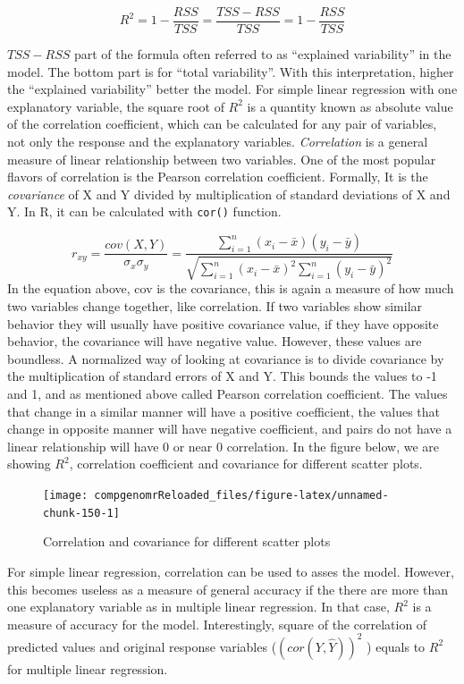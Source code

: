 \documentclass[12pt,]{krantz}
\begin{document}
\[R^2=1-\frac{RSS}{TSS}=\frac{TSS-RSS}{TSS}=1-\frac{RSS}{TSS}\]

\(TSS-RSS\) part of the formula often referred to as ``explained variability'' in
the model. The bottom part is for ``total variability''. With this interpretation, higher
the ``explained variability'' better the model. For simple linear regression
with one explanatory variable, the square root of \(R^2\) is a quantity known
as absolute value of the correlation coefficient, which can be calculated for any pair of variables, not only
the
response and the explanatory variables. \emph{Correlation} is a general measure of
linear
relationship between two variables. One
of the most popular flavors of correlation is the Pearson correlation coefficient. Formally, It is the
\emph{covariance} of X and Y divided by multiplication of standard deviations of
X and Y. In R, it can be calculated with \texttt{cor()} function.

\[ 
r_{xy}=\frac{cov(X,Y)}{\sigma_x\sigma_y}
      =\frac{\sum\limits_{i=1}^n (x_i-\bar{x})(y_i-\bar{y})}
            {\sqrt{\sum\limits_{i=1}^n (x_i-\bar{x})^2 \sum\limits_{i=1}^n (y_i-\bar{y})^2}}
\]
In the equation above, cov is the covariance, this is again a measure of
how much two variables change together, like correlation. If two variables
show similar behavior they will usually have positive covariance value, if they have opposite behavior, the covariance will have negative value.
However, these values are boundless. A normalized way of looking at
covariance is to divide covariance by the multiplication of standard
errors of X and Y. This bounds the values to -1 and 1, and as mentioned
above called Pearson correlation coefficient. The values that change in a similar manner will have a positive coefficient, the values that change in
opposite manner will have negative coefficient, and pairs do not have
a linear relationship will have 0 or near 0 correlation. In
the figure below, we are showing \(R^2\), correlation
coefficient and covariance for different scatter plots.

\begin{figure}

{\centering \texttt{[image: compgenomrReloaded\_files/figure-latex/unnamed-chunk-150-1]} 

}

\caption{Correlation and covariance for different scatter plots}\label{fig:unnamed-chunk-150}
\end{figure}

For simple linear regression, correlation can be used to asses the model. However, this becomes useless as a measure of general accuracy
if the there are more than one explanatory
variable as in multiple linear regression. In that case, \(R^2\) is a measure
of accuracy for the model. Interestingly, square of the
correlation of predicted values
and original response variables (\((cor(Y,\hat{Y}))^2\) ) equals to \(R^2\) for
multiple linear regression.
\end{document}
